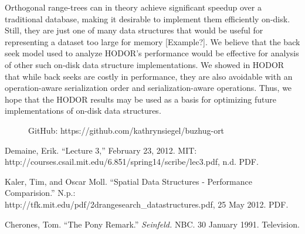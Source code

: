 \documentclass[11pt, oneside]{article}
\begin{document}
Orthogonal range-trees can in theory achieve significant speedup over a
traditional database, making it desirable to implement them efficiently
on-disk. Still, they are just one of many data structures that would be useful
for representing a dataset too large for memory [Example?]. We believe that the
back seek model used to analyze HODOR's performance would be effective for
analysis of other such on-disk data structure implementations. We showed in
HODOR that while back seeks are costly in performance, they are also avoidable
with an operation-aware serialization order and serialization-aware operations.
Thus, we hope that the HODOR results may be used as a basis for optimizing
future implementations of on-disk data structures. 

\begin{figure}[b]
    GitHub: https://github.com/kathrynsiegel/buzhug-ort
\end{figure}

\newpage

\begin{thebibliography}{1}
    
     Demaine, Erik. ``Lecture 3,'' February 23, 2012.  MIT: \\
        http://courses.csail.mit.edu/6.851/spring14/scribe/lec3.pdf, n.d. PDF.

     Kaler, Tim, and Oscar Moll. ``Spatial Data Structures -
        Performance Comparision.'' N.p.: \\
        http://tfk.mit.edu/pdf/2drangesearch\_datastructures.pdf, 25 May 2012.
        PDF.

     Cherones, Tom. ``The Pony Remark.'' \textit{Seinfeld.}
        NBC. 30 January 1991. Television.

\end{thebibliography}
\end{document}
